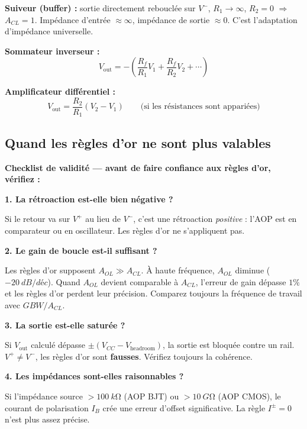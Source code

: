 \documentclass[12pt,a4paper,twoside]{book}
\begin{document}
\textbf{Suiveur (buffer) :} sortie directement rebouclée sur $V^-$, $R_1 \to \infty$, $R_2 = 0$ $\Rightarrow$ $A_{CL} = 1$. Impédance d'entrée $\approx \infty$, impédance de sortie $\approx 0$. C'est l'adaptation d'impédance universelle.

\textbf{Sommateur inverseur :}
\[
V_{\text{out}} = -\left(\frac{R_f}{R_1}V_1 + \frac{R_f}{R_2}V_2 + \cdots\right)
\]

\textbf{Amplificateur différentiel :}
\[
V_{\text{out}} = \frac{R_2}{R_1}(V_2 - V_1) \qquad \text{(si les résistances sont appariées)}
\]

\subsection{Quand les règles d'or ne sont plus valables}

\begin{attention}
\textbf{Checklist de validité --- avant de faire confiance aux règles d'or, vérifiez :}

\textbf{1. La rétroaction est-elle bien négative ?}

Si le retour va sur $V^+$ au lieu de $V^-$, c'est une rétroaction \textit{positive} : l'AOP est en comparateur ou en oscillateur. Les règles d'or ne s'appliquent pas.

\textbf{2. Le gain de boucle est-il suffisant ?}

Les règles d'or supposent $A_{OL} \gg A_{CL}$. À haute fréquence, $A_{OL}$ diminue ($-\SI{20}{dB/déc}$). Quand $A_{OL}$ devient comparable à $A_{CL}$, l'erreur de gain dépasse $1\%$ et les règles d'or perdent leur précision. Comparez toujours la fréquence de travail avec $GBW/A_{CL}$.

\textbf{3. La sortie est-elle saturée ?}

Si $V_{\text{out}}$ calculé dépasse $\pm(V_{CC} - V_{\text{headroom}})$, la sortie est bloquée contre un rail. $V^+ \neq V^-$, les règles d'or sont \textbf{fausses}. Vérifiez toujours la cohérence.

\textbf{4. Les impédances sont-elles raisonnables ?}

Si l'impédance source $> \SI{100}{k\ohm}$ (AOP BJT) ou $> \SI{10}{G\ohm}$ (AOP CMOS), le courant de polarisation $I_B$ crée une erreur d'offset significative. La règle $I^{\pm} = 0$ n'est plus assez précise.
\end{attention}
\end{document}
